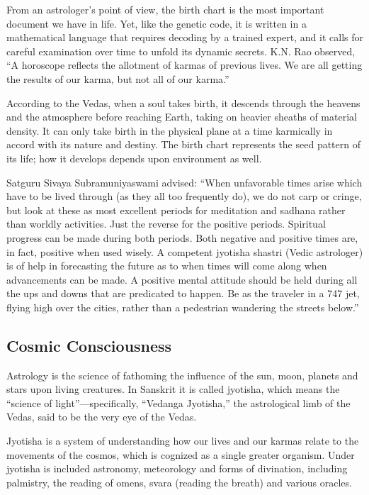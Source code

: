  

From an astrologer’s point of view, the birth chart is the most important document we have in life. Yet, like the genetic code, it is written in a mathematical language that requires decoding by a trained expert, and it calls for careful examination over time to unfold its dynamic secrets. K.N. Rao observed, “A horoscope reflects the allotment of karmas of previous lives. We are all getting the results of our karma, but not all of our karma.”

 

According to the Vedas, when a soul takes birth, it descends through the heavens and the atmosphere before reaching Earth, taking on heavier sheaths of material density. It can only take birth in the physical plane at a time karmically in accord with its nature and destiny. The birth chart represents the seed pattern of its life; how it develops depends upon environment as well.

 

Satguru Sivaya Subramuniyaswami advised: “When unfavorable times arise which have to be lived through (as they all too frequently do), we do not carp or cringe, but look at these as most excellent periods for meditation and sadhana rather than worldly activities. Just the reverse for the positive periods. Spiritual progress can be made during both periods. Both negative and positive times are, in fact, positive when used wisely. A competent jyotisha shastri (Vedic astrologer) is of help in forecasting the future as to when times will come along when advancements can be made. A positive mental attitude should be held during all the ups and downs that are predicated to happen. Be as the traveler in a 747 jet, flying high over the cities, rather than a pedestrian wandering the streets below.”

 

\subsection{Cosmic Consciousness}

Astrology is the science of fathoming the influence of the sun, moon, planets and stars upon living creatures. In Sanskrit it is called jyotisha, which means the “science of light”—specifically, “Vedanga Jyotisha,” the astrological limb of the Vedas, said to be the very eye of the Vedas.

 

Jyotisha is a system of understanding how our lives and our karmas relate to the movements of the cosmos, which is cognized as a single greater organism. Under jyotisha is included astronomy, meteorology and forms of divination, including palmistry, the reading of omens, svara (reading the breath) and various oracles.

